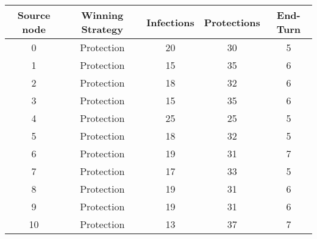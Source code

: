 \documentclass[results.tex]{subfiles}
\begin{document}
    \begin{center}
        \begin{tabular}{| c || c | c | c | c |}
            \hline
            {\bfseries Source node} & {\bfseries Winning Strategy} & {\bfseries Infections} & {\bfseries Protections}
            & {\bfseries End-Turn}
            \\  %
            \hline\hline
            0                       & Protection                   & 20                     & 30                      & 5                    \\
            \hline
            1                       & Protection                   & 15                     & 35                      & 6                    \\
            \hline
            2                       & Protection                   & 18                     & 32                      & 6                    \\
            \hline
            3                       & Protection                   & 15                     & 35                      & 6                    \\
            \hline
            4                       & Protection                   & 25                     & 25                      & 5                    \\
            \hline
            5                       & Protection                   & 18                     & 32                      & 5                    \\
            \hline
            6                       & Protection                   & 19                     & 31                      & 7                    \\
            \hline
            7                       & Protection                   & 17                     & 33                      & 5                    \\
            \hline
            8                       & Protection                   & 19                     & 31                      & 6                    \\
            \hline
            9                       & Protection                   & 19                     & 31                      & 6                    \\
            \hline
            10                      & Protection                   & 13                     & 37                      & 7                    \\

\end{tabular}
\end{center}
\end{document}
